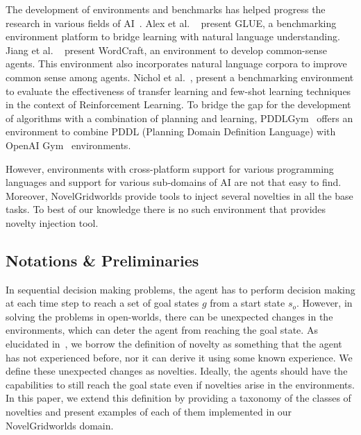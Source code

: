 \documentclass[sigconf]{aamas}
\begin{document}
The development of environments and benchmarks has helped progress the research in various fields of AI~\citep{wang2018glue, fu2020d4rl, nichol2018gotta, pardo2020tonic, silver2020pddlgym}. Alex et al. ~\citep{wang2018glue} present GLUE, a benchmarking environment platform to bridge learning with natural language understanding. Jiang et al. ~\citep{jiang2020wordcraft} present WordCraft, an environment to develop common-sense agents. This environment also incorporates natural language corpora to improve common sense among agents.
Nichol et al.~\citep{nichol2018gotta}, present a benchmarking environment to evaluate the effectiveness of transfer learning and few-shot learning techniques in the context of Reinforcement Learning. To bridge the gap for the development of algorithms with a combination of planning and learning, PDDLGym~\citep{silver2020pddlgym} offers an environment to combine PDDL (Planning Domain Definition Language) with OpenAI Gym~\citep{1606.01540} environments.

However, environments with cross-platform support for various programming languages and support for various sub-domains of AI are not that easy to find. Moreover, NovelGridworlds provide tools to inject several novelties in all the base tasks. To best of our knowledge there is no such environment that provides novelty injection tool. 

\subsection{Notations \& Preliminaries}
\label{sec:prelims}
In sequential decision making problems, the agent has to perform decision making at each time step to reach a set of goal states $g$ from a start state $s_o$. However, in solving the problems in open-worlds, there can be unexpected changes in the environments, which can deter the agent from reaching the goal state. As elucidated in~\citep{muhammad2021novelty}, we borrow the definition of novelty as something that the agent has not experienced before, nor it can derive it using some known experience. 
We define these unexpected changes as novelties. Ideally, the agents should have the capabilities to still reach the goal state even if novelties arise in the environments. In this paper, we extend this definition by providing a taxonomy of the classes of novelties and present examples of each of them implemented in our NovelGridworlds domain.
\end{document}
